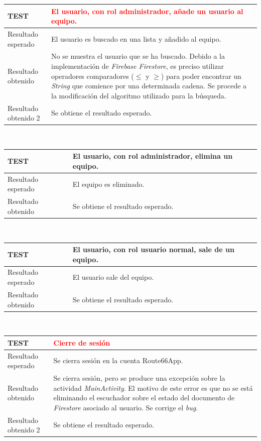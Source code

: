 \documentclass[twoside]{report}
\newcommand\addrow[2]{#1 &#2\\ }
\newcommand\addheading[2]{#1 &#2\\ \hline}
\newcommand\tabularhead{\begin{tabular}{lp{0.7\textwidth}}
\hline
}
\newenvironment{test}{\tabularhead}
{\hline\end{tabular}}
\begin{document}
\vspace{0.5cm}

\begin{test}
 \addheading{\textbf{TEST\arabic{test}}}{\textcolor{red}{El usuario, con rol administrador, añade un usuario al equipo.}}
 \addrow{Resultado esperado}{El usuario es buscado en una lista y añadido al equipo.}
 \addrow{Resultado obtenido}{No se muestra el usuario que se ha buscado. Debido a la implementación de \textit{Firebase Firestore}, es preciso utilizar operadores comparadores ($\leqslant$ y $\geqslant$) para poder encontrar un \textit{String} que comience por una determinada cadena. Se procede a la modificación del algoritmo utilizado para la búsqueda. }
  \addrow{Resultado obtenido 2}{Se obtiene el resultado esperado.}
\end{test}\\

\vspace{0.5cm}

\begin{test}
 \addheading{\textbf{TEST\arabic{test}}}{El usuario, con rol administrador, elimina un equipo.}
 \addrow{Resultado esperado}{El equipo es eliminado.}
 \addrow{Resultado obtenido}{Se obtiene el resultado esperado.}
\end{test}\\

\vspace{0.5cm}

\begin{test}
 \addheading{\textbf{TEST\arabic{test}}}{El usuario, con rol usuario normal, sale de un equipo.}
 \addrow{Resultado esperado}{El usuario sale del equipo.}
 \addrow{Resultado obtenido}{Se obtiene el resultado esperado.}
\end{test}\\

\vspace{0.5cm}

\begin{test}
 \addheading{\textbf{TEST\arabic{test}}}{\textcolor{red}{Cierre de sesión}}
 \addrow{Resultado esperado}{Se cierra sesión en la cuenta Route66App.}
 \addrow{Resultado obtenido}{Se cierra sesión, pero se produce una excepción sobre la actividad 			\textit{MainActivity}. El motivo de este error es que no se está eliminando el escuchador sobre el estado del documento de \textit{Firestore} asociado al usuario. Se corrige el \textit{bug}.}
 \addrow{Resultado obtenido 2}{Se obtiene el resultado esperado.}
\end{test}\\
\end{document}
